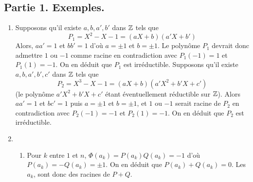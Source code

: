 \subsection*{Partie 1. Exemples.}
\begin{enumerate}
\item Supposons qu'il existe $a, b, a', b'$ dans $\mathbb{Z}$ tels que
\begin{displaymath}
 P_1=X^2-X-1=(aX+b)(a'X+b')
\end{displaymath}
Alors, $aa'=1$ et $bb'=1$ d'où $a=\pm 1$ et $b=\pm 1$. Le polynôme $P_1$ devrait donc admettre $1$ ou $-1$ comme racine en contradiction avec $P_1(-1)=1$ et $P_1(1)=-1$. On en déduit que $P_1$ est irréductible.\newline
Supposons qu'il existe $a, b, a', b',c'$ dans $\mathbb{Z}$ tels que
\begin{displaymath}
 P_2=X^3-X-1=(aX+b)(a'X^2+b'X+c')
\end{displaymath}
(le polynôme $a'X^2+b'X+c'$ étant éventuellement réductible sur $\mathbb{Z}$). Alors $aa'=1$ et $bc'=1$ puis $a=\pm 1$ et $b=\pm 1$, et $1$ ou $-1$ serait racine de $P_2$ en contradiction avec $P_2(-1)=-1$ et $P_2(1)=-1$. On en déduit que $P_2$ est irréductible.
\item 
\begin{enumerate}
\item Pour $k$ entre $1$ et $n$, $\Phi(a_k)=P(a_k)Q(a_k)=-1$ d'où $P(a_k)=-Q(a_k)=\pm 1$. On en déduit que $P(a_k)+Q(a_k)=0$. Les $a_k$, sont donc des racines de $P+Q$.


\end{enumerate}
\end{enumerate}
